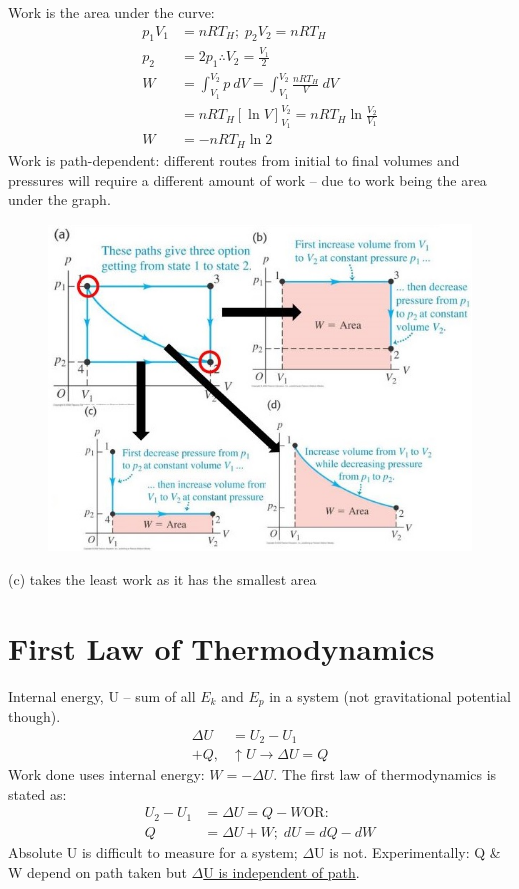\documentclass[a4paper, 11pt, normalem]{report}
\begin{document}
Work is the area under the curve:
\begin{align}
    p_{1}V_{1} &= nRT_{H}; \; p_{2}V_{2} = nRT_{H} \\
    p_{2} &= 2p_{1} \therefore V_{2} = \frac{V_{1}}{2} \\
	W &= \int_{V_{1}}^{V_{2}} p\:dV = \int_{V_{1}}^{V_{2}} \frac{nRT_{H}}{V}\:dV \\
      &= nRT_{H}[\ln{V}]_{V_{1}}^{V_{2}} = nRT_{H}\ln{\frac{V_{2}}{V_{1}}} \\
    W &= -nRT_{H}\ln{2}
\end{align}
Work is path-dependent: different routes from initial to final volumes and pressures will require a different amount of work -- due to work being the area under the graph.
\begin{figure}[H]
    \centering
    \includegraphics[scale=0.7]{Paths.jpg}
\end{figure}
(c) takes the least work as it has the smallest area

\section{First Law of Thermodynamics}
Internal energy, U -- sum of all $E_{k}$ and $E_{p}$ in a system (not gravitational potential though).
\begin{align}
    {\Delta}U &= U_{2} - U_{1} \\
    + Q, &\uparrow U \rightarrow {\Delta}U = Q 
\end{align}
Work done uses internal energy: $W = -{\Delta}U$.
The first law of thermodynamics is stated as:
\begin{align}
    U_{2} - U_{1} &= {\Delta}U = Q - W \text{OR: }\\
    Q &= {\Delta}U + W; \; dU = dQ - dW
\end{align}
Absolute U is difficult to measure for a system; $\Delta$U is not.
Experimentally: Q \& W depend on path taken but \underline{$\Delta$U is independent of path}.
\end{document}
